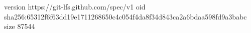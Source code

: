 version https://git-lfs.github.com/spec/v1
oid sha256:65312f6f63dd19e1711268650c4c054f4da8f34d843ca2a6bdaa598fd9a3babc
size 87544
